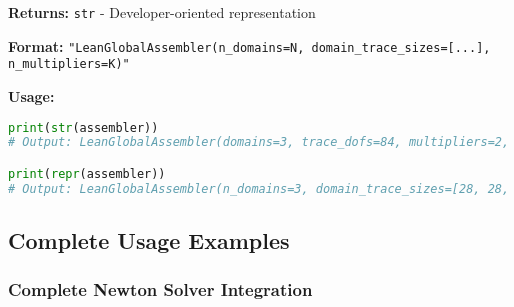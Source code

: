 \textbf{Returns:} \texttt{str} - Developer-oriented representation

\textbf{Format:} \texttt{"LeanGlobalAssembler(n\_domains=N, domain\_trace\_sizes=[...], n\_multipliers=K)"}

\textbf{Usage:}
\begin{lstlisting}[language=Python, caption=String Methods Usage]
print(str(assembler))
# Output: LeanGlobalAssembler(domains=3, trace_dofs=84, multipliers=2, total_dofs=86)

print(repr(assembler))
# Output: LeanGlobalAssembler(n_domains=3, domain_trace_sizes=[28, 28, 28], n_multipliers=2)
\end{lstlisting}

\subsection{Complete Usage Examples}
\label{subsec:complete_usage_examples}

\subsubsection{Complete Newton Solver Integration}

